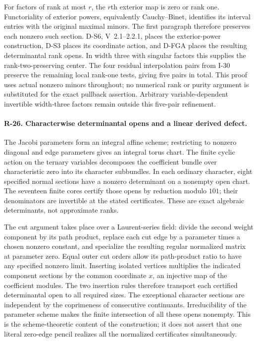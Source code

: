 For factors of rank at most $r$, the $r$th exterior map is
zero or rank one. Functoriality of exterior powers, equivalently
Cauchy--Binet, identifies its interval entries with the
original maximal minors. The first paragraph therefore
preserves each nonzero such section. D-S6, V~2.1--2.2.1,
places the exterior-power construction, D-S3 places its
coordinate action, and D-FGA places the resulting determinantal
rank opens. In width three with singular factors this supplies
the rank-two-preserving center. The four residual interpolation
pairs from I-30 preserve the remaining local rank-one tests,
giving five pairs in total. This proof uses actual nonzero
minors throughout; no numerical rank or purity argument is
substituted for the exact pullback assertion. Arbitrary
variable-dependent invertible width-three factors remain
outside this five-pair refinement.


\paragraph{R-26. Characterwise determinantal opens and a linear derived defect.}
The Jacobi parameters form an integral affine scheme; restricting
to nonzero diagonal and edge parameters gives an integral torus
chart. The finite cyclic action on the ternary variables decomposes
the coefficient bundle over characteristic zero into its character
subbundles. In each ordinary character, eight specified normal
sections have a nonzero determinant on a nonempty open chart.
The seventeen finite cores certify those opens by reduction modulo
$101$; their denominators are invertible at the stated certificates.
These are exact algebraic determinants, not approximate ranks.

The cut argument takes place over a Laurent-series field: divide
the second weight component by its path product, replace each cut
edge by a parameter times a chosen nonzero constant, and specialize
the resulting regular normalized matrix at parameter zero. Equal
outer cut orders allow its path-product ratio to have any specified
nonzero limit. Inserting isolated vertices multiplies the indicated
component sections by the common coordinate $x$, an injective map
of the coefficient modules. The two insertion rules therefore
transport each certified determinantal open to all required sizes.
The exceptional character sections are independent by the
coprimeness of consecutive continuants. Irreducibility of the
parameter scheme makes the finite intersection of all these opens
nonempty. This is the scheme-theoretic content of the construction;
it does not assert that one literal zero-edge pencil realizes all
the normalized certificates simultaneously.

